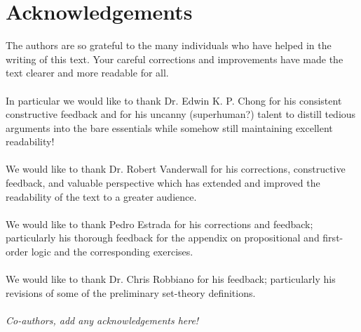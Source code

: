\section{Acknowledgements}
The authors are so grateful to the many individuals who have helped in the writing of this text. Your careful corrections and improvements have made the text clearer and more readable for all.
 \\ \\
In particular we would like to thank Dr. Edwin K. P. Chong for his consistent constructive feedback and for his uncanny (superhuman?) talent to distill tedious arguments into the bare essentials while somehow still maintaining excellent readability! \\ \\
We would like to thank Dr. Robert Vanderwall for his corrections, constructive feedback, and valuable perspective which has extended and improved the readability of the text to a greater audience. 
\\ \\
We would like to thank Pedro Estrada for his corrections and feedback; particularly his thorough feedback for the appendix on propositional and first-order logic and the corresponding exercises. \\ \\
We would like to thank Dr. Chris Robbiano for his feedback; particularly his revisions of some of the preliminary set-theory definitions. \\ \\
\textit{Co-authors, add any acknowledgements here!}